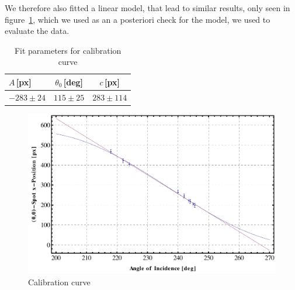 \documentclass[a4paper,10pt]{scrartcl}
\begin{document}
We therefore also fitted a linear model, that lead to similar results, only seen in figure~\ref{fig:calib}, which we used as an a posteriori check for the model, we used to evaluate the data.

\begin{table}
\begin{center}
\begin{tabular}{lcc}
\toprule
$A$\,[px] & $\theta_{0}$\,[deg] & $c$\,[px] \\
\midrule
$-283 \pm 24$ & $115 \pm 25$  & $283 \pm 114$ \\
\bottomrule
\end{tabular}
\end{center}
\par
\caption{Fit parameters for calibration curve \label{tab:calibdata}}
\end{table}

\begin{figure}
\centering
\includegraphics[scale=0.55]{img/calib}
\caption{Calibration curve \label{fig:calib}}
\end{figure}
\end{document}

